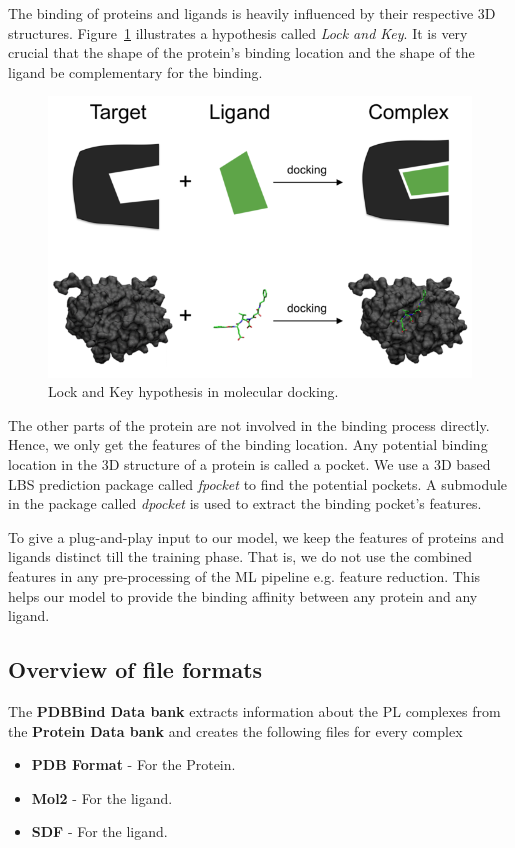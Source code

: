 \documentclass[11pt]{article}
\begin{document}
The binding of proteins and ligands is heavily influenced by their respective 3D structures.
Figure~\ref{fig:lockandkey} illustrates a hypothesis called \textit{Lock and Key}.
It is very crucial that the shape of the protein's binding location and the shape of the ligand be complementary for the binding.

\begin{figure}[htb]
  \centering
    \includegraphics[scale=0.7]{images/lock_and_key}
    \caption{Lock and Key hypothesis in molecular docking.  \cite{lockandkeyformatpng}}
    \label{fig:lockandkey}
\end{figure}

The other parts of the protein are not involved in the binding process directly.
Hence,  we only get the features of the binding location.
Any potential binding location in the 3D structure of a protein is called a pocket.
We use a 3D based LBS prediction package called \textit{fpocket} to find the potential pockets.
A submodule in the package called \textit{dpocket} is used to extract the binding pocket's features.

To give a plug-and-play input to our model, we keep the features of proteins and ligands distinct till the training phase.
That is,  we do not use the combined features in any pre-processing of the ML pipeline e.g.  feature reduction.
This helps our model to provide the binding affinity between any protein and any ligand.



\subsection{Overview of file formats}
The \textbf{PDBBind Data bank} extracts information about the PL complexes from the \textbf{Protein Data bank} and creates the following files for every complex
\begin{itemize}
\item \textbf{PDB Format} - For the Protein.
\item  \textbf{Mol2} - For the ligand.
\item \textbf{SDF} - For the ligand.
\end{itemize}
\end{document}

